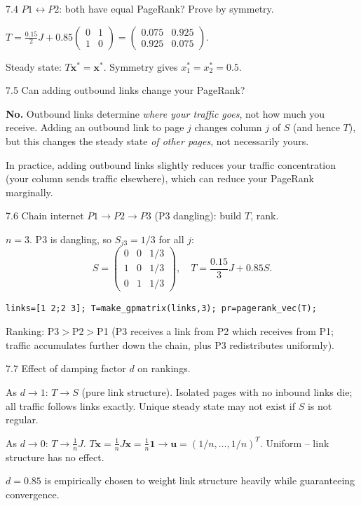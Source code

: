 \begin{exercise}{7.4}
$P1\leftrightarrow P2$: both have equal PageRank? Prove by symmetry.
\end{exercise}
\begin{solution}
$T=\frac{0.15}{2}J+0.85\begin{pmatrix}0&1\\1&0\end{pmatrix}=\begin{pmatrix}0.075&0.925\\0.925&0.075\end{pmatrix}$.

Steady state: $T\mathbf{x}^*=\mathbf{x}^*$. Symmetry gives $x_1^*=x_2^*=0.5$.
\end{solution}

\begin{exercise}{7.5}
Can adding outbound links change your PageRank?
\end{exercise}
\begin{solution}
\textbf{No.} Outbound links determine \emph{where your traffic goes}, not how much you receive. Adding an outbound link to page $j$ changes column $j$ of $S$ (and hence $T$), but this changes the steady state \textit{of other pages}, not necessarily yours.

In practice, adding outbound links slightly reduces your traffic concentration (your column sends traffic elsewhere), which can reduce your PageRank marginally.
\end{solution}

\begin{exercise}{7.6}
Chain internet $P1\to P2\to P3$ (P3 dangling): build $T$, rank.
\end{exercise}
\begin{solution}
$n=3$. P3 is dangling, so $S_{j3}=1/3$ for all $j$:
\[S=\begin{pmatrix}0&0&1/3\\1&0&1/3\\0&1&1/3\end{pmatrix}, \quad T=\frac{0.15}{3}J+0.85S.\]
\begin{lstlisting}
links=[1 2;2 3]; T=make_gpmatrix(links,3); pr=pagerank_vec(T);
\end{lstlisting}
Ranking: P3$>$P2$>$P1 (P3 receives a link from P2 which receives from P1; traffic accumulates further down the chain, plus P3 redistributes uniformly).
\end{solution}

\begin{exercise}{7.7}
Effect of damping factor $d$ on rankings.
\end{exercise}
\begin{solution}
As $d\to1$: $T\to S$ (pure link structure). Isolated pages with no inbound links die; all traffic follows links exactly. Unique steady state may not exist if $S$ is not regular.

As $d\to0$: $T\to\frac{1}{n}J$. $T\mathbf{x}=\frac{1}{n}J\mathbf{x}=\frac{1}{n}\mathbf{1}\to\mathbf{u}=(1/n,\ldots,1/n)^T$. Uniform -- link structure has no effect.

$d=0.85$ is empirically chosen to weight link structure heavily while guaranteeing convergence.
\end{solution}

